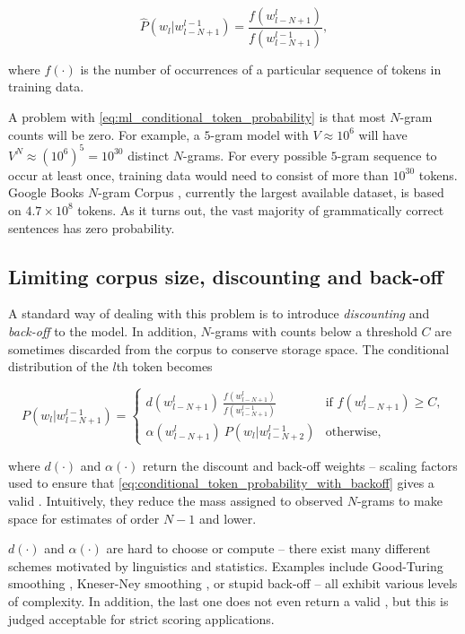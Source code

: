 \documentclass[draft]{IIBproject}
\makeatletter
\DeclareRobustCommand*{\AbbreviationWithDot}[1]{\@ifnextchar{.}{#1}{#1.\@\xspace}}
\DeclareRobustCommand*{\pmf}{\AbbreviationWithDot{p.m.f}}
\makeatother
\begin{document}
\begin{equation}
\label{eq:ml_conditional_token_probability}
\hat P( w_l | w_{l-N+1}^{l-1} ) = \frac {f(w_{l-N+1}^l)} {f(w_{l-N+1}^{l-1})},
\end{equation}

where $f(\cdot)$ is the number of occurrences of a particular sequence of tokens in training data.

A problem with \cref{eq:ml_conditional_token_probability} is that most $N$-gram counts will be zero. For example, a $5$-gram model with $V \approx 10^6$ will have $V^N \approx \left( 10^6 \right)^5 = 10^{30}$ distinct $N$-grams. For every possible $5$-gram sequence to occur at least once, training data would need to consist of more than $10^{30}$ tokens. Google Books $N$-gram Corpus \cite{googlengrams2011}, currently the largest available dataset, is based on $4.7 \times 10^{8}$ tokens. As it turns out, the vast majority of grammatically correct sentences has zero probability.

\FloatBarrier
\subsection{Limiting corpus size, discounting and back-off}

A standard way of dealing with this problem is to introduce \emph{discounting} and \emph{back-off} to the model. In addition, $N$-grams with counts below a threshold $C$ are sometimes discarded from the corpus to conserve storage space. The conditional distribution of the $l$th token becomes

\begin{equation}
	\label{eq:conditional_token_probability_with_backoff}
	P( w_l | w_{l-N+1}^{l-1} ) =
	\begin{cases}
		d (w_{l-N+1}^l) ~ \frac {f\left(w_{l-N+1}^l \right)} {f\left(w_{l-N+1}^{l-1} \right)} & \text{if $f(w_{l-N+1}^l) \ge C$},\\
		\alpha (w_{l-N+1}^l) ~ P( w_l | w_{l-N+2}^{l-1} ) & \text{otherwise},
	\end{cases}
\end{equation}

where $d(\cdot)$ and $\alpha(\cdot)$ return the discount and back-off weights -- scaling factors used to ensure that \cref{eq:conditional_token_probability_with_backoff} gives a valid \pmf. Intuitively, they reduce the mass assigned to observed $N$-grams to make space for estimates of order $N{-}1$ and lower.

$d(\cdot)$ and $\alpha(\cdot)$ are hard to choose or compute -- there exist many different schemes motivated by linguistics and statistics. Examples include Good-Turing smoothing \cite{good1953}, Kneser-Ney smoothing \cite{kneserney1995}, or stupid back-off \cite{brants2007} -- all exhibit various levels of complexity. In addition, the last one does not even return a valid \pmf, but this is judged acceptable for strict scoring applications.
\end{document}
